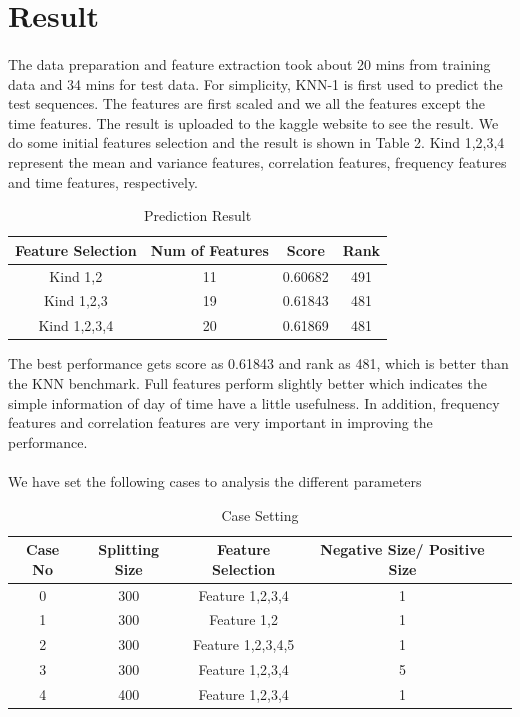 \documentclass{article}
\begin{document}
	\section{Result} %
	\label{sec:result}
	\paragraph{} The data preparation and feature extraction took about 20 mins from training data and 34 mins for test data. For simplicity, KNN-1 is first used to predict the test sequences. The features are first scaled and we all the features except the time features. The result is uploaded to the kaggle website to see the result. We do some initial features selection and the result is shown in Table 2. Kind 1,2,3,4 represent the mean and variance features, correlation features, frequency features and time features, respectively.
	\begin{table}
		\centering
		\caption{Prediction Result}
		\begin{tabular}{c|c|c|c}
			Feature Selection & Num of Features & Score & Rank \\ \hline
			Kind 1,2 & 11 & 0.60682 & 491 \\
			Kind 1,2,3 & 19 & 0.61843 & 481 \\ 
			Kind 1,2,3,4 & 20 & 0.61869 & 481 \\
		\end{tabular}
	\end{table}
	The best performance gets score as 0.61843 and rank as 481, which is better than the KNN benchmark. Full features perform slightly better which indicates the simple information of day of time have a little usefulness. In addition, frequency features and correlation features are very important in improving the performance.
	
	\paragraph{} We have set the following cases to analysis the different parameters 
	
	\begin{table}
		\centering
		\caption{Case Setting}
		\begin{tabular}{c|c|c|c|c}
			Case No & Splitting Size & Feature Selection & Negative Size/ Positive Size \\ \hline
			0 & 300 & Feature 1,2,3,4 & 1 \\
			1 & 300 & Feature 1,2     & 1  \\
			2 & 300 & Feature 1,2,3,4,5 & 1 \\
			3 & 300 & Feature 1,2,3,4 & 5  \\
			4 & 400 & Feature 1,2,3,4 & 1 \\
		\end{tabular}
	\end{table}
	
\end{document}
